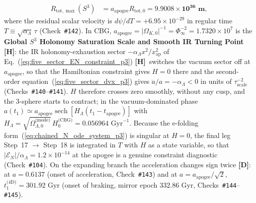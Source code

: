 \documentclass[11pt,a4paper]{article}
\newcommand{\catD}{\textbf{\textcolor{blue!75!black}{[D]}}}
\newcommand{\catH}{\textbf{\textcolor{orange!85!black}{[H]}}}
\theoremstyle{plain}
\theoremstyle{definition}
\theoremstyle{remark}
\numberwithin{equation}{section}
\begin{document}
\begin{enumerate}
\begin{align}
    R_{\text{tot},\max}(S^3) &= a_{\text{apogee}} R_{\text{tot},0} = \mathbf{9.9008 \times 10^{36}\text{ m}},
    \label{eq:exact_restitution_friedmann}
  \end{align}
  where the residual scalar velocity is $d\psi/dT = +6.95 \times 10^{-29}$ in regular time $T \equiv \sqrt{\alpha_{\Lambda}}\,\tau$ (Check~\texttt{\#142}). In CBG, $a_{\text{apogee}} = \lvert\Omega_{K,0}\rvert^{-1} = \Phi_{\infty}^{-2} = 1.7320 \times 10^7$ is the \textbf{Global $S^3$ Holonomy Saturation Scale and Smooth IR Turning Point} \catH: the IR holonomy-exhaustion sector $-\alpha_{\Lambda}x^2/x_{\text{ap}}^2$ of Eq.~(\ref{eq:five_sector_EN_constraint_p3}) \catH\ switches the vacuum sector off at $a_{\text{apogee}}$, so that the Hamiltonian constraint gives $H = 0$ there and the second-order equation~(\ref{eq:five_sector_dvx_p3}) gives $\ddot{a}/a = -\alpha_{\Lambda} < 0$ in units of $\tau_{\text{scale}}^{-2}$ (Checks~\texttt{\#140}--\texttt{\#141}). $H$ therefore crosses zero smoothly, without any cusp, and the 3-sphere starts to contract; in the vacuum-dominated phase $a(t_1) \simeq a_{\text{apogee}}\operatorname{sech}[H_{\Lambda}(t_1 - t_{\text{apogee}})]$ with $H_{\Lambda} = \sqrt{\Omega_{\Lambda,0}^{\text{(mode)}}}\,H_0^{\text{(CBG)}} = 0.056964\text{ Gyr}^{-1}$. Because the e-folding form~(\ref{eq:chained_N_ode_system_p3}) is singular at $H = 0$, the final leg Step~17 $\to$ Step~18 is integrated in $T$ with $H$ as a state variable, so that $|\mathcal{E}_N|/\alpha_{\Lambda} = 1.2 \times 10^{-14}$ at the apogee is a genuine constraint diagnostic (Check~\texttt{\#104}). On the expanding branch the acceleration changes sign twice \catD: at $a = 0.6137$ (onset of acceleration, Check~\texttt{\#143}) and at $a = a_{\text{apogee}}/\sqrt{2}$, $t_1^{\text{(4D)}} = 301.92\text{ Gyr}$ (onset of braking, mirror epoch $332.86\text{ Gyr}$, Checks~\texttt{\#144}--\texttt{\#145}).


\end{enumerate}
\end{document}
